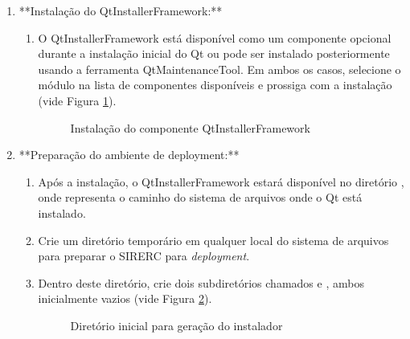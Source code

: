 \documentclass[a4paper,11pt]{article}
\newcommand{\sistema}{\textsf{SIRERC}}
\begin{document}
\begin{enumerate}
	\item **Instalação do QtInstallerFramework:**
	\begin{enumerate}
		\item O QtInstallerFramework está disponível como um componente opcional durante a instalação inicial do Qt ou pode ser instalado posteriormente usando a ferramenta QtMaintenanceTool. Em ambos os casos, selecione o módulo na lista de componentes disponíveis e prossiga com a instalação (vide Figura \ref{fig:qtinstallerframework}).
		
		\begin{figure}[H]\centering
			\caption{Instalação do componente QtInstallerFramework}\label{fig:qtinstallerframework}
		\end{figure}
	\end{enumerate}
	
	\item **Preparação do ambiente de deployment:**
	\begin{enumerate}
		\item Após a instalação, o QtInstallerFramework estará disponível no diretório , onde  representa o caminho do sistema de arquivos onde o Qt está instalado.
		\item Crie um diretório temporário em qualquer local do sistema de arquivos para preparar o \sistema{} para \emph{deployment}.
		\item Dentro deste diretório, crie dois subdiretórios chamados  e , ambos inicialmente vazios (vide Figura \ref{fig:sirercinstallerdir}).
		
		\begin{figure}[H]\centering
			\caption{Diretório inicial para geração do instalador}\label{fig:sirercinstallerdir}
		\end{figure}
	\end{enumerate}
	

\end{enumerate}
\end{document}
